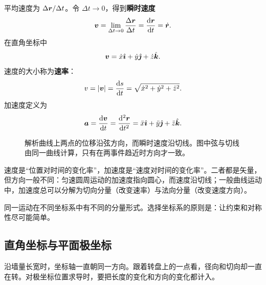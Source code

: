 平均速度为 $\Delta\boldsymbol{r}/\Delta t$。令 $\Delta t\to0$，得到\textbf{瞬时速度}
\begin{equation}
\boldsymbol{v}=\lim_{\Delta t\to0}\frac{\Delta\boldsymbol{r}}{\Delta t}
=\frac{\mathrm{d} \boldsymbol{r}}{\mathrm{d} t}=\dot{\boldsymbol{r}}.
\label{eq:velocity}
\end{equation}
在直角坐标中
\begin{equation}
\boldsymbol{v}=\dot x\hat{\boldsymbol{\imath}}+\dot y\hat{\boldsymbol{\jmath}}+\dot z\hat{\boldsymbol{k}} .
\end{equation}
速度的大小称为\textbf{速率}：
\begin{equation}
v=|\boldsymbol{v}|=\frac{\mathrm{d} s}{\mathrm{d} t}=\sqrt{\dot x^2+\dot y^2+\dot z^2}.
\end{equation}
加速度定义为
\begin{equation}
\boldsymbol{a}=\frac{\mathrm{d} \boldsymbol{v}}{\mathrm{d} t}=\frac{\mathrm{d}^2 \boldsymbol{r}}{\mathrm{d} t^2}
=\ddot x\hat{\boldsymbol{\imath}}+\ddot y\hat{\boldsymbol{\jmath}}+\ddot z\hat{\boldsymbol{k}} .
\label{eq:acceleration}
\end{equation}

\begin{figure}[htbp]
\centering
{}
\caption{解析曲线上两点的位移沿弦方向，而瞬时速度沿切线。图中弦与切线由同一曲线计算，只有在两事件趋近时方向才一致。}
\label{fig:displacement}
\end{figure}

\begin{physicsbox}
速度是“位置对时间的变化率”，加速度是“速度对时间的变化率”。二者都是矢量，但方向一般不同：匀速圆周运动的加速度指向圆心，而速度沿切线；一般曲线运动中，加速度总可以分解为切向分量（改变速率）与法向分量（改变速度方向）。
\end{physicsbox}


同一运动在不同坐标系中有不同的分量形式。选择坐标系的原则是：让约束和对称性尽可能简单。

\subsection{直角坐标与平面极坐标}

沿墙量长宽时，坐标轴一直朝同一方向。跟着转盘上的一点看，径向和切向却一直在转。对极坐标位置求导时，要把长度的变化和方向的变化都计入。

